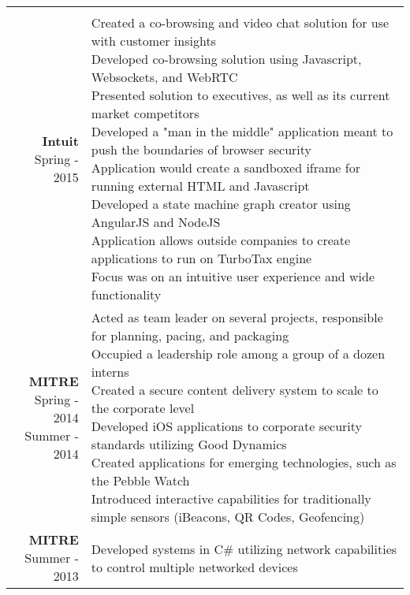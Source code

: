 \documentclass{article}
\makeatletter
\newcommand*\lineBr[2][c]{\begin{tabular}[#1]{@{}r@{}}#2\end{tabular}}
\newcommand*\lineBl[2][c]{\begin{tabular}[#1]{@{}l@{}}#2\end{tabular}}
\makeatother
\begin{document}
\begin{tabularx}{\textwidth}{ r | X }
{  } \\
  \vspace{4mm}
  \lineBr{ {\large {\bf Intuit }\\[2mm]Spring - 2015}} &
  \lineBl{
    Created a co-browsing and video chat solution for use with customer insights \\[2mm]
    Developed co-browsing solution using Javascript, Websockets, and WebRTC \\[2mm]
    Presented solution to executives, as well as its current market competitors \\[2mm]
    Developed a "man in the middle" application meant to push the boundaries of browser security \\[2mm]
    Application would create a sandboxed iframe for running external HTML and Javascript \\[2mm]
    Developed a state machine graph creator using AngularJS and NodeJS \\[2mm]
    Application allows outside companies to create applications to run on TurboTax engine \\[2mm]
    Focus was on an intuitive user experience and wide functionality 
  } \\
  \vspace{4mm}
  \lineBr{ {\large {\bf MITRE }\\[2mm]Spring - 2014\\Summer - 2014}} &
  \lineBl{
    Acted as team leader on several projects, responsible for planning, pacing, and packaging \\[2mm]
    Occupied a leadership role among a group of a dozen interns \\[2mm]
    Created a secure content delivery system to scale to the corporate level \\[2mm]
    Developed iOS applications to corporate security standards utilizing Good Dynamics \\[2mm]
    Created applications for emerging technologies, such as the Pebble Watch \\[2mm]
    Introduced interactive capabilities for traditionally simple sensors (iBeacons, QR Codes, Geofencing) \\[2mm]
  } \\
  \vspace{4mm}
  \lineBr{ {\large {\bf MITRE }\\[2mm]Summer - 2013}} &
  \lineBl{
    Developed systems in C\# utilizing network capabilities to control multiple networked devices \\[2mm]
}
\end{tabularx}
\end{document}
